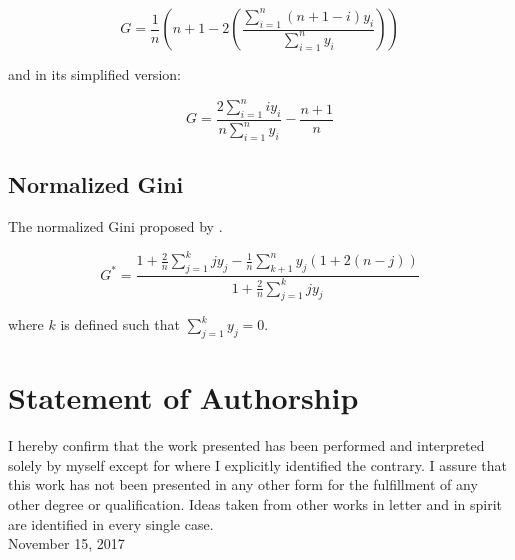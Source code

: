 \documentclass[a4paper,12pt,legno]{article}
\begin{document}
\begin{equation*}
G = \frac{1}{n} \left(n+1-2 \left( \frac{\sum_{i=1}^n (n+1-i)y_{i}}{\sum_{i=1}^n y_{i}}\right)\right)
\end{equation*}

and in its simplified version: 

\begin{equation*}
G = \frac{2\sum_{i=1}^n iy_{i}}{n \sum_{i=1}^n y_{i}} - \frac{n+1}{n}
\end{equation*}

\subsection{Normalized Gini}
The normalized Gini proposed by \cite{chen1982}. 

\begin{equation*}
G^{*} = \frac{1+\frac{2}{n}\sum_{j=1}^k jy_{j} - \frac{1}{n}\sum_{k+1}^n y_{j}(1+2(n-j))}{1+\frac{2}{n}\sum_{j=1}^k jy_{j}}
\end{equation*}

where $k$ is defined such that $\sum_{j=1}^k y_{j} = 0$.

\newpage



\section*{Statement of Authorship}
I hereby confirm that the work presented has been performed and interpreted solely by myself except for where I explicitly identified the contrary. I assure that this work has not been presented in any other form for the fulfillment of any other degree or qualification. Ideas taken from other works in letter and in spirit are identified in every single case.
\\[1in] November 15, 2017
\end{document}
